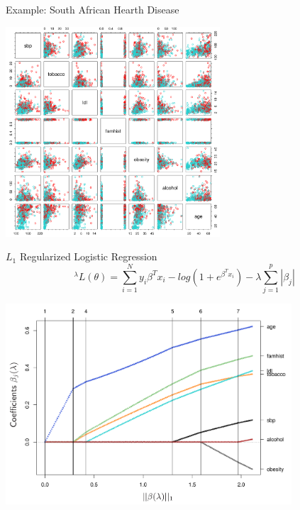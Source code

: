 \documentclass{beamer}
\begin{document}
\begin{frame}{Example: South African Hearth Disease}
\begin{center}
\includegraphics[width=0.6\textwidth]{scatter.png}
\end{center}
\end{frame}


\begin{frame}{$L_1$ Regularized Logistic Regression}
\begin{equation*}
{}^{\lambda}L(\theta) = \sum_{i=1}^N y_i \beta^T x_i - log(1+e^{\beta^T x_i}) - \lambda \sum_{j=1}^p |\beta_j|
\end{equation*}
\begin{center}
\includegraphics[width=0.8\textwidth]{L1.png}
\end{center}
\end{frame}
\end{document}

